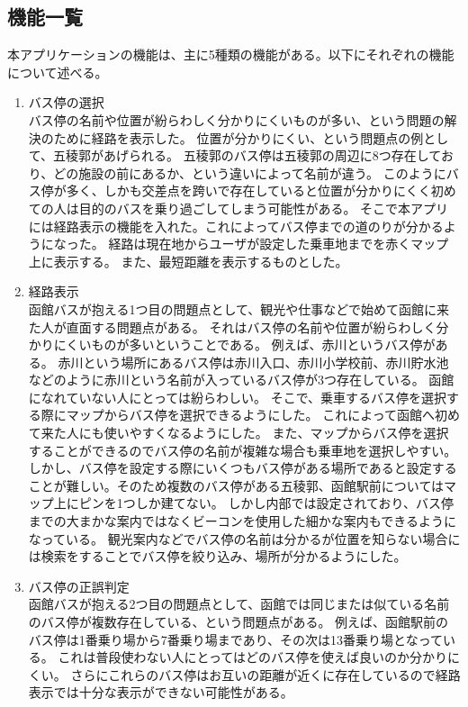 \documentclass[openany,11pt,papersize]{jsbook}
\begin{document}
\subsection{機能一覧}
本アプリケーションの機能は、主に5種類の機能がある。以下にそれぞれの機能について述べる。
\begin{enumerate}

\item バス停の選択\\
バス停の名前や位置が紛らわしく分かりにくいものが多い、という問題の解決のために経路を表示した。
位置が分かりにくい、という問題点の例として、五稜郭があげられる。
五稜郭のバス停は五稜郭の周辺に8つ存在しており、どの施設の前にあるか、という違いによって名前が違う。
このようにバス停が多く、しかも交差点を跨いで存在していると位置が分かりにくく初めての人は目的のバスを乗り過ごしてしまう可能性がある。
そこで本アプリには経路表示の機能を入れた。これによってバス停までの道のりが分かるようになった。
経路は現在地からユーザが設定した乗車地までを赤くマップ上に表示する。
また、最短距離を表示するものとした。
\item 経路表示\mbox{}\\
函館バスが抱える1つ目の問題点として、観光や仕事などで始めて函館に来た人が直面する問題点がある。
それはバス停の名前や位置が紛らわしく分かりにくいものが多いということである。
例えば、赤川というバス停がある。
赤川という場所にあるバス停は赤川入口、赤川小学校前、赤川貯水池などのように赤川という名前が入っているバス停が3つ存在している。
函館になれていない人にとっては紛らわしい。
そこで、乗車するバス停を選択する際にマップからバス停を選択できるようにした。
これによって函館へ初めて来た人にも使いやすくなるようにした。
また、マップからバス停を選択することができるのでバス停の名前が複雑な場合も乗車地を選択しやすい。
しかし、バス停を設定する際にいくつもバス停がある場所であると設定することが難しい。そのため複数のバス停がある五稜郭、函館駅前についてはマップ上にピンを1つしか建てない。
しかし内部では設定されており、バス停までの大まかな案内ではなくビーコンを使用した細かな案内もできるようになっている。
観光案内などでバス停の名前は分かるが位置を知らない場合には検索をすることでバス停を絞り込み、場所が分かるようにした。
\item バス停の正誤判定\mbox{}\\
函館バスが抱える2つ目の問題点として、函館では同じまたは似ている名前のバス停が複数存在している、という問題点がある。
例えば、函館駅前のバス停は1番乗り場から7番乗り場まであり、その次は13番乗り場となっている。
これは普段使わない人にとってはどのバス停を使えば良いのか分かりにくい。
さらにこれらのバス停はお互いの距離が近くに存在しているので経路表示では十分な表示ができない可能性がある。

\end{enumerate}
\end{document}
